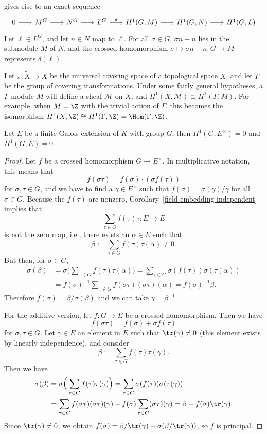 gives rise to an exact sequence
\[\begin{tikzcd}[column sep=scriptsize]
0\ar[r]&M^G\ar[r]&N^G\ar[r]&L^G\ar[r,"\delta"]&H^1(G,M)\ar[r]&H^1(G,N)\ar[r]&H^1(G,L)
\end{tikzcd}\]
Let $\ell\in L^G$, and let $n\in N$ map to $\ell$. For all $\sigma\in G$, $\sigma n-n$ lies in the submodule $M$ of $N$, and the crossed homomorphism $\sigma\mapsto\sigma n-n:G\to M$ represents $\delta(\ell)$.
\begin{example}
Let $\pi:\widetilde{X}\to X$ be the universal covering space of a topological space $X$, and let $\Gamma$ be the group of covering transformations. Under some fairly general hypotheses, a $\Gamma$-module $M$ will define a sheaf $\mathcal{M}$ on $X$, and $H^1(X,\mathcal{M})\cong H^1(\Gamma,M)$. For example, when $M=\Z$ with the trivial action of $\Gamma$, this becomes the isomorphism $H^1(X,\Z)\cong H^1(\Gamma,\Z)=\Hom(\Gamma,\Z)$.
\end{example}
\begin{theorem}\label{field ext H^1(G,E^*) H^1(G,E) is trivial}
Let $E$ be a finite Galois extension of $K$ with group $G$; then $H^1(G,E^{\times})=0$ and $H^1(G,E)=0$.
\end{theorem}
\begin{proof}
Let $f$ be a crossed homomorphism $G\to E^\times$. In multiplicative notation, this means that
\[f(\sigma\tau)=f(\sigma)\cdot (\sigma f(\tau))\]
for $\sigma,\tau\in G$, and we have to find a $\gamma\in E^\times$ such that $f(\sigma)=\sigma(\gamma)/\gamma$ for all $\sigma\in G$. Because the $f(\tau)$ are nonzero, Corollary~\ref{field embedding independent} implies that
\[\sum_{\tau\in G}f(\tau)\tau:E\to E\]
is not the zero map, i.e., there exists an $\alpha\in E$ such that
\[\beta:=\sum_{\tau\in G}f(\tau)\tau(\alpha)\neq 0.\]
But then, for $\sigma\in G$,
\begin{align*}
\sigma(\beta)&=\sigma\Big(\sum_{\tau\in G}f(\tau)\tau(\alpha)\Big)=\sum_{\tau\in G}\sigma(f(\tau))\sigma(\tau(\alpha))\\
&=f(\sigma)^{-1}\sum_{\tau\in G}f(\sigma\tau)(\sigma\tau)(\alpha)=f(\sigma)^{-1}\beta.
\end{align*}
Therefore $f(\sigma)=\beta/\sigma(\beta)$ and we can take $\gamma=\beta^{-1}$.\par
For the additive version, let $f:G\to E$ be a crossed homomorphism. Then we have
\[f(\sigma\tau)=f(\sigma)+\sigma f(\tau)\]
for $\sigma,\tau\in G$. Let $\gamma\in E$ an element in $E$ such that $\tr(\gamma)\neq 0$ (this element exists by linearly independence), and consider
\[\beta:=\sum_{\tau\in G}f(\tau)\tau(\gamma).\]
Then we have
\begin{align*}
\sigma(\beta)&=\sigma\Big(\sum_{\tau\in G}f(\tau)\tau(\gamma)\Big)=\sum_{\tau\in G}\sigma(f(\tau))\sigma(\tau(\gamma))\\
&=\sum_{\tau\in G}f(\sigma\tau)(\sigma\tau)(\gamma)-f(\sigma)\sum_{\tau\in G}(\sigma\tau)(\gamma)=\beta-f(\sigma)\tr(\gamma).
\end{align*}
Since $\tr(\gamma)\neq 0$, we obtain $f(\sigma)=\beta/\tr(\gamma)-\sigma(\beta/\tr(\gamma))$, so $f$ is principal.
\end{proof}

